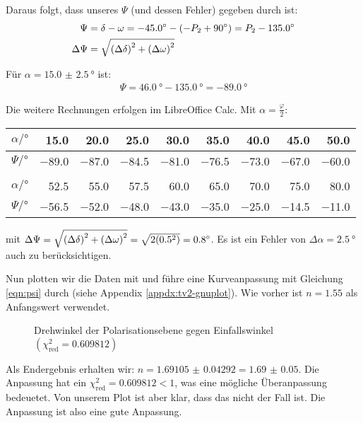 	Daraus folgt, dass unseres $\Psi$ (und dessen Fehler) gegeben durch ist:
	\begin{align}
		\Psi &= \delta - \omega = \SI{-45.0}{\degree} - \left(-P_2 + \SI{90}{\degree}\right) = P_2 - \SI{135.0}{\degree} \\
		\Delta\Psi &= \addquad{\delta,\omega}
	\end{align}
	\begin{beispiel}
		Für $\alpha = \SI{15.0(25)}{\degree}$ ist:
		\begin{align}
			\Psi = \SI{46.0}{\degree} - \SI{135.0}{\degree} = \SI{-89.0}{\degree}
		\end{align}
	\end{beispiel}
	Die weitere Rechnungen erfolgen im LibreOffice Calc.
	\newpage
	Mit $\alpha = \frac{\varphi}{2}$:
	\begin{center}
		\begin{tabular}{l*{8}{r}}
			\toprule
			$\alpha / \si{\degree}$ & \num{15.0} & \num{20.0} & \num{25.0} & \num{30.0} & \num{35.0} & \num{40.0} & \num{45.0} & \num{50.0} \\
			\midrule
			$\Psi / \si{\degree}$   & \num{-89.0} & \num{-87.0} & \num{-84.5} & \num{-81.0} & \num{-76.5} & \num{-73.0} & \num{-67.0} & \num{-60.0} \\
			\bottomrule
			\\[-0.5em]
			\toprule
			$\alpha / \si{\degree}$ & \num{52.5} & \num{55.0} & \num{57.5} & \num{60.0} & \num{65.0} & \num{70.0} & \num{75.0} & \num{80.0} \\
			\midrule
			$\Psi / \si{\degree}$   & \num{-56.5} & \num{-52.0} & \num{-48.0} & \num{-43.0} & \num{-35.0} & \num{-25.0} & \num{-14.5} & \num{-11.0} \\
			\bottomrule
		\end{tabular}
	\end{center}
	mit $\Delta\Psi = \addquad{\delta,\omega} = \sqrt{2(\num{0.5}^2)} = \SI{0.8}{\degree}$. Es ist ein Fehler von $\Delta \alpha = \SI{2.5}{\degree}$ auch zu berücksichtigen.

	Nun plotten wir die Daten mit \gnuplot{} und führe eine Kurveanpassung mit Gleichung \eqref{eqn:psi} durch (siehe Appendix \ref{appdx:tv2-gnuplot}). Wie vorher ist $n = \num{1.55}$ als Anfangswert verwendet.
	\begin{figure}[H]
		\centering
		
		\caption{\centering Drehwinkel der Polarisationsebene gegen Einfallswinkel $(\chi^2_{\text{red}} = 0.609812)$ }
		\label{fig:tvtwo-plot}
		\vspace{-1em}
	\end{figure}
	Als Endergebnis erhalten wir: $n = \num{1.69105(4292)} = \num{1.69(5)}$. Die Anpassung hat ein $\chi^2_{\text{red}} = 0.609812 < 1$, was eine mögliche Überanpassung bedeuetet. Von unserem Plot ist aber klar, dass das nicht der Fall ist. Die Anpassung ist also eine gute Anpassung. 
	\newpage
